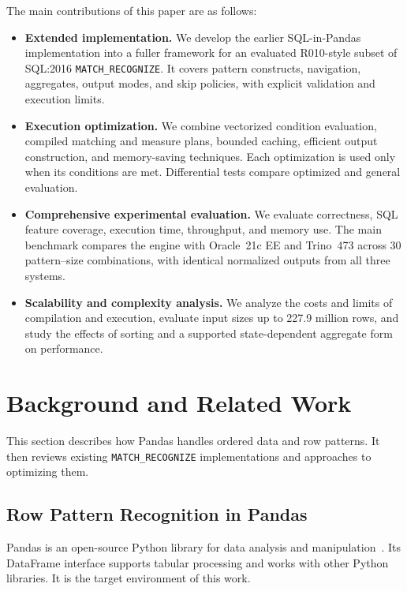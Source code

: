 \documentclass[preprint,12pt,times,a4paper]{elsarticle}
\begin{document}
The main contributions of this paper are as follows:
\begin{itemize}[beginpenalty=10000]
  \item \textbf{Extended implementation.} We develop the earlier
    SQL-in-Pandas implementation into a fuller framework for an evaluated
    R010-style subset of SQL:2016 \texttt{MATCH\_RECOGNIZE}. It covers
    pattern constructs, navigation, aggregates, output modes, and skip
    policies, with explicit validation and execution limits.
  \item \textbf{Execution optimization.} We combine vectorized condition
    evaluation, compiled matching and measure plans, bounded caching,
    efficient output construction, and memory-saving techniques. Each
    optimization is used only when its conditions are met. Differential
    tests compare optimized and general evaluation.
  \item \textbf{Comprehensive experimental evaluation.} We evaluate
    correctness, SQL feature coverage, execution time, throughput, and
    memory use. The main benchmark compares the engine with Oracle~21c EE
    and Trino~473 across 30 pattern--size combinations, with identical
    normalized outputs from all three systems.
  \item \textbf{Scalability and complexity analysis.} We analyze the
    costs and limits of compilation and execution, evaluate input sizes
    up to 227.9 million rows, and study the effects of sorting and a
    supported state-dependent aggregate form on performance.
\end{itemize}

\section{Background and Related Work}

This section describes how Pandas handles ordered data and row patterns. It
then reviews existing \texttt{MATCH\_RECOGNIZE} implementations and approaches
to optimizing them.

\subsection{Row Pattern Recognition in Pandas}

Pandas is an open-source Python library for data analysis and
manipulation~\cite{McKinney2010}. Its DataFrame interface supports tabular
processing and works with other Python libraries. It is the target environment
of this work.
\end{document}
